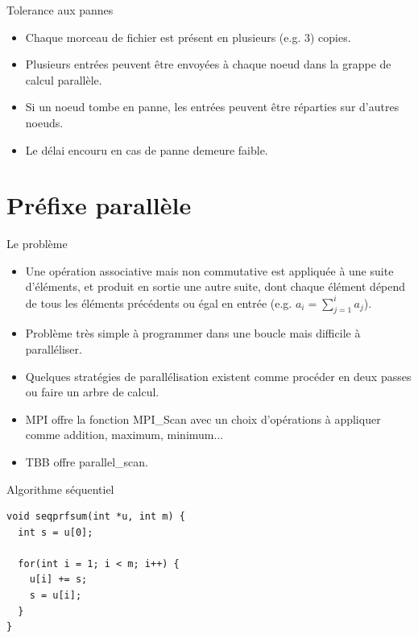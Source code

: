 \documentclass[10pt]{beamer}
\begin{document}
\begin{frame}{Tolerance aux pannes}

  \begin{itemize}
    \item Chaque morceau de fichier est présent en plusieurs (e.g. 3) copies.

    \item Plusieurs entrées peuvent être envoyées à chaque noeud dans la grappe de calcul parallèle.

    \item Si un noeud tombe en panne, les entrées peuvent être réparties sur d'autres noeuds.

    \item Le délai encouru en cas de panne demeure faible.
  \end{itemize}
\end{frame}

\section{Préfixe parallèle}

\begin{frame}{Le problème}

  \begin{itemize}
    \item Une opération associative mais non commutative est appliquée à une suite d'éléments, et produit en sortie une autre suite, dont chaque élément dépend de tous les éléments précédents ou égal en entrée (e.g. $a_i = \sum_{j=1}^i a_j$).

    \item Problème très simple à programmer dans une boucle mais difficile à paralléliser.

    \item Quelques stratégies de parallélisation existent comme procéder en deux passes ou faire un arbre de calcul.

    \item MPI offre la fonction MPI\_Scan avec un choix d'opérations à appliquer comme addition, maximum, minimum...

    \item TBB offre parallel\_scan.
  \end{itemize}
\end{frame}

\begin{frame}[fragile]{Algorithme séquentiel}

  \scriptsize
  \begin{verbatim}
void seqprfsum(int *u, int m) { 
  int s = u[0];

  for(int i = 1; i < m; i++) { 
    u[i] += s; 
    s = u[i]; 
  } 
}

  \end{verbatim}
\end{frame}
\end{document}
